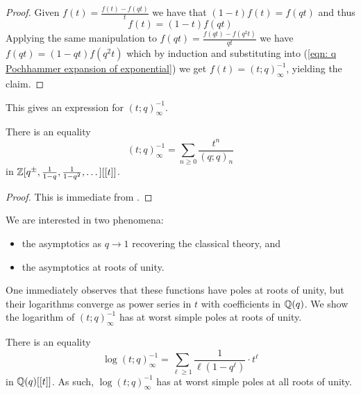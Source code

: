 \begin{proof}
    Given $f(t)=\frac{f(t)-f(qt)}{t}$ we have that $(1-t)f(t)=f(qt)$ and thus 
    \begin{equation}\label{eqn: q Pochhammer expansion of exponential}
        f(t) = (1-t)f(qt)
    \end{equation} Applying the same manipulation to $f(qt)=\frac{f(qt)-f(q^{2}t)}{qt}$ we have $f(qt)=(1-qt)f(q^{2}t)$ which by induction and substituting into (\ref{eqn: q Pochhammer expansion of exponential}) we get $f(t)=(t;q)_{\infty}^{-1}$, yielding the claim. 
\end{proof}
This gives an expression for $(t;q)_{\infty}^{-1}$. 
\begin{corollary}
    There is an equality
    $$(t;q)_{\infty}^{-1}=\sum_{n\geq0}\frac{t^{n}}{(q;q)_{n}}$$
    in $\mathbb{Z}[q^{\pm},\frac{1}{1-q},\frac{1}{1-q^{2}}, \dots][[t]]$.
\end{corollary}
\begin{proof}
    This is immediate from .
\end{proof}
We are interested in two phenomena:
\begin{itemize}
    \item the asymptotics as $q\to 1$ recovering the classical theory, and 
    \item the asymptotics at roots of unity. 
\end{itemize}
One immediately observes that these functions have poles at roots of unity, but their logarithms converge as power series in $t$ with coefficients in $\mathbb{Q}(q)$. We show the logarithm of $(t;q)_{\infty}^{-1}$ has at worst simple poles at roots of unity. 
\begin{proposition}\label{prop: logarithm at worst simple poles at roots of unity}
    There is an equality 
    \begin{equation}\label{eqn: expresssion of logarithm of q exponential}
        \log(t;q)_{\infty}^{-1}=\sum_{\ell\geq1}\frac{1}{\ell(1-q^{\ell})}\cdot t^{\ell}
    \end{equation}
    in $\mathbb{Q}(q)[[t]]$. As such, $\log(t;q)_{\infty}^{-1}$ has at worst simple poles at all roots of unity. 
\end{proposition}
